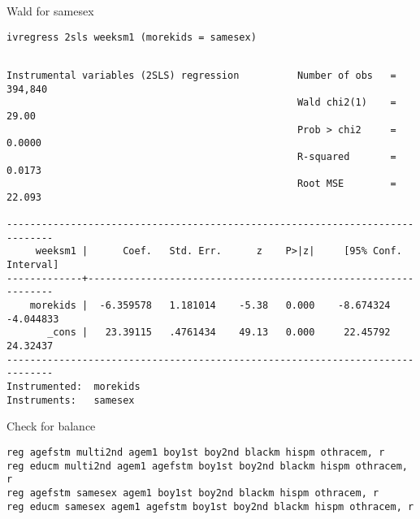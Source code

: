 \documentclass[cache=false]{article}
\begin{document}
Wald for samesex
\begin{verbatim}
ivregress 2sls weeksm1 (morekids = samesex)
\end{verbatim}

\begin{verbatim}

Instrumental variables (2SLS) regression          Number of obs   =    394,840
                                                  Wald chi2(1)    =      29.00
                                                  Prob > chi2     =     0.0000
                                                  R-squared       =     0.0173
                                                  Root MSE        =     22.093

------------------------------------------------------------------------------
     weeksm1 |      Coef.   Std. Err.      z    P>|z|     [95% Conf. Interval]
-------------+----------------------------------------------------------------
    morekids |  -6.359578   1.181014    -5.38   0.000    -8.674324   -4.044833
       _cons |   23.39115   .4761434    49.13   0.000     22.45792    24.32437
------------------------------------------------------------------------------
Instrumented:  morekids
Instruments:   samesex
\end{verbatim}

Check for balance
\begin{verbatim}
reg agefstm multi2nd agem1 boy1st boy2nd blackm hispm othracem, r
reg educm multi2nd agem1 agefstm boy1st boy2nd blackm hispm othracem, r
reg agefstm samesex agem1 boy1st boy2nd blackm hispm othracem, r
reg educm samesex agem1 agefstm boy1st boy2nd blackm hispm othracem, r
\end{verbatim}
\end{document}
